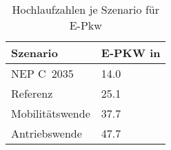 {
\renewcommand{\arraystretch}{1.2}%
\begin{table}[H]
	\begin{center}
		\caption{Hochlaufzahlen je Szenario für E-Pkw}
		\begin{tabu} to 0.7\textwidth {X[1] X[1, r]}
			\hline
			Szenario         & E-PKW in \si{\MioStk}	\\ \hline
			NEP C~\num{2035} & \num{14.0}               \\
			Referenz         & \num{25.1}               \\
			Mobilitätswende  & \num{37.7}               \\
			Antriebswende    & \num{47.7}               \\ \hline
		\end{tabu}
		\label{tab:SzenarienRampUp}
	\end{center}
	\vspace{-3mm}%
\end{table}
}